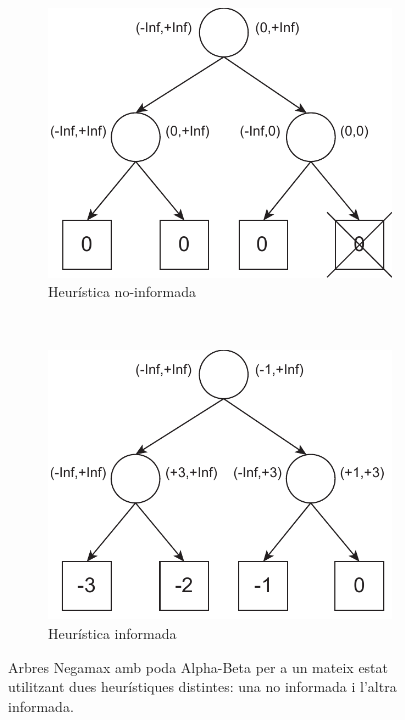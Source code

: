 \documentclass[12pt,a4paper]{article}
\begin{document}
\begin{figure}[h]
\centering
\begin{subfigure}[b]{0.4\textwidth}
\includegraphics[width=\textwidth]{negamax_heur_simple.pdf}
\caption{Heurística no-informada}
\end{subfigure}
~
\begin{subfigure}[b]{0.4\textwidth}
\includegraphics[width=\textwidth]{negamax_heur_informed.pdf}
\caption{Heurística informada}
\end{subfigure}
\caption{Arbres Negamax amb poda Alpha-Beta per a un mateix estat utilitzant dues heurístiques distintes: una no informada i l'altra informada.}
\label{fig:comp_negamax_heur}
\end{figure}
\end{document}
